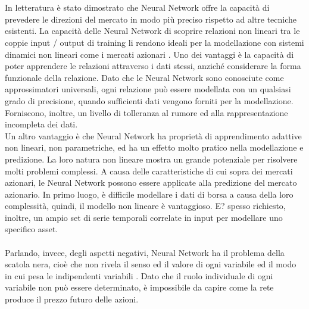 \documentclass[a4paper,12pt]{report}
\begin{document}
\\~\\In letteratura è stato dimostrato che Neural Network offre la capacità di prevedere le direzioni del mercato in modo più preciso rispetto ad altre tecniche esistenti. La capacità delle Neural Network di scoprire relazioni non lineari tra le coppie input / output di training li rendono ideali per la modellazione con sistemi dinamici non lineari come i mercati azionari \cite{nn1}. Uno dei vantaggi è la capacità di poter apprendere le relazioni attraverso i dati stessi, anziché considerare la forma funzionale della relazione. Dato che le Neural Network sono conosciute come approssimatori universali, ogni relazione può essere modellata con un qualsiasi grado di precisione, quando sufficienti dati vengono forniti per la modellazione. Forniscono, inoltre, un livello di tolleranza al rumore ed alla rappresentazione incompleta dei dati.\\
Un altro vantaggio è che Neural Network ha proprietà di apprendimento adattive non lineari, non parametriche, ed ha un effetto molto pratico nella modellazione e predizione. La loro natura non lineare mostra un grande potenziale per risolvere molti problemi complessi. A causa delle caratteristiche di cui sopra dei mercati azionari, le Neural Network possono essere applicate alla predizione del mercato azionario. In primo luogo, è difficile modellare i dati di borsa a causa della loro complessità, quindi, il modello non lineare è vantaggioso. E? spesso richiesto, inoltre, un ampio set di serie temporali correlate in input per modellare uno specifico asset.\\~\\Parlando, invece, degli aspetti negativi, Neural Network ha il problema della scatola nera, cioè che non rivela il senso ed il valore di ogni variabile ed il modo in cui pesa le indipendenti variabili \cite{nn1}. Dato che il ruolo individuale di ogni variabile non può essere determinato, è impossibile da capire come la rete produce il prezzo futuro delle azioni.\\
\end{document}
